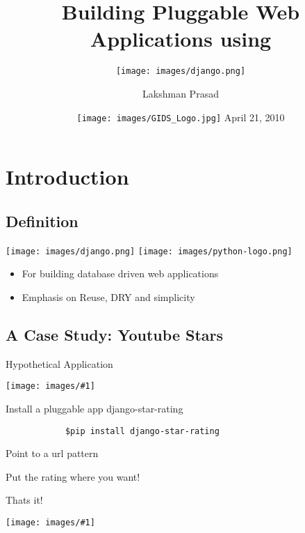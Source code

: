 \documentclass[19.9pt]{beamer}
\title{Building Pluggable Web Applications using
}
\institute{Agiliq Solutions}
\subtitle{\texttt{[image: images/django.png]}}
\author{Lakshman Prasad}
\date{
	\texttt{[image: images/GIDS\_Logo.jpg]}\linebreak
	April 21, 2010}
\newcommand{\img}[1]{
			\begin{center}
				\texttt{[image: images/\#1]}
			\end{center}		
}
\begin{document}
\begin{frame}
	\titlepage
\end{frame}

\section{Introduction}
	\subsection{Definition}
		{ 
		\begin{frame}
			{\texttt{[image: images/django.png]}\linebreak
				\texttt{[image: images/python-logo.png]}}
		\begin{itemize}                                                 				\item
			For building \alert{database driven} web applications                 \pause \item
			Emphasis on Reuse, DRY and simplicity
		\end{itemize}
		\end{frame}
		}
	\subsection{A Case Study: Youtube Stars}
		\begin{frame}
			{Hypothetical Application}
			\img{amazonscreen2.jpg}
		\end{frame}
		\begin{frame}[fragile]
			{Install a pluggable app \alert{django-star-rating} }
			\begin{verbatim}			
			$pip install django-star-rating
			\end{verbatim}
			\lstset{language=python}			
				 
		\end{frame}
		\begin{frame}
			{Point to a url pattern}
			\lstset{language=python}			
				 
		\end{frame}
		\begin{frame}
			{Put the rating where you want!}
			\lstset{language=html}			
				 			
		\end{frame}
		\begin{frame}
			{Thats it!}
			\img{umoja2.jpg}
		\end{frame}
		
\end{document}
